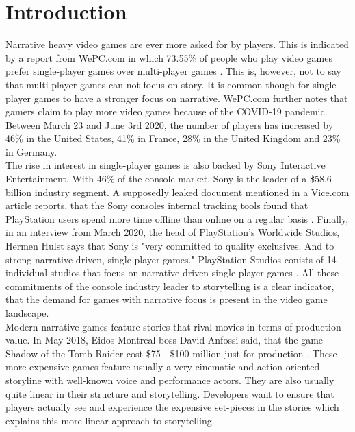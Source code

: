 \chapter{Introduction}
Narrative heavy video games are ever more asked for by players. This is indicated by a report from WePC.com in which 73.55\% of people who play video games prefer single-player games over multi-player games \cite{WePC2021}. This is, however, not to say that multi-player games can not focus on story. It is common though for single-player games to have a stronger focus on narrative. WePC.com further notes that gamers claim to play more video games because of the COVID-19 pandemic. Between March 23 and June 3rd 2020, the number of players has increased by 46\% in the United States, 41\% in France, 28\% in the United Kingdom and 23\% in Germany. \cite{WePC2021}\\
The rise in interest in single-player games is also backed by Sony Interactive Entertainment. With 46\% of the console market, Sony is the leader of a \$58.6 billion industry segment. \cite{Dealessandri2021} A supposedly leaked document mentioned in a Vice.com article reports, that the Sony consoles internal tracking tools found that PlayStation users spend more time offline than online on a regular basis \cite{Klepek2020}. Finally, in an interview from March 2020, the head of PlayStation's Worldwide Studios, Hermen Hulst says that Sony is "very committed to quality exclusives. And to strong narrative-driven, single-player games." \cite{Shuman2021} PlayStation Studios conists of 14 individual studios that focus on narrative driven single-player games \cite{Sony2021}. All these commitments of the console industry leader to storytelling is a clear indicator, that the demand for games with narrative focus is present in the video game landscape.\\
Modern narrative games feature stories that rival movies in terms of production value. In May 2018, Eidos Montreal boss David Anfossi said, that the game Shadow of the Tomb Raider cost \$75 - \$100 million just for production \cite{Dring2018}. These more expensive games feature usually a very cinematic and action oriented storyline with well-known voice and performance actors. They are also usually quite linear in their structure and storytelling. Developers want to ensure that players actually see and experience the expensive set-pieces in the stories  which explains this more linear approach to storytelling.\\
